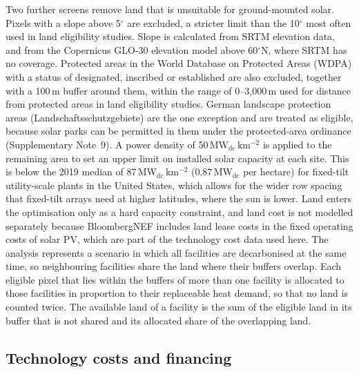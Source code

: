 \documentclass[11pt]{article}
\begin{document}
Two further screens remove land that is unsuitable for ground-mounted solar. Pixels with a slope above 5$^\circ$ are excluded, a stricter limit than the 10$^\circ$ most often used in land eligibility studies\cite{ryberg2017framework}. Slope is calculated from SRTM elevation data\cite{farr2007srtm}, and from the Copernicus GLO-30 elevation model\cite{copernicusglo30} above 60$^\circ$N, where SRTM has no coverage. Protected areas in the World Database on Protected Areas (WDPA)\cite{wdpa} with a status of designated, inscribed or established are also excluded, together with a 100\,m buffer around them, within the range of 0--3,000\,m used for distance from protected areas in land eligibility studies\cite{ryberg2017framework}. German landscape protection areas (Landschaftsschutzgebiete) are the one exception and are treated as eligible, because solar parks can be permitted in them under the protected-area ordinance\cite{keabw2026lsg} (Supplementary Note~9). A power density of 50\,MW$_{\mathrm{dc}}$\,km$^{-2}$ is applied to the remaining area to set an upper limit on installed solar capacity at each site. This is below the 2019 median of 87\,MW$_{\mathrm{dc}}$\,km$^{-2}$ (0.87\,MW$_{\mathrm{dc}}$ per hectare) for fixed-tilt utility-scale plants in the United States\cite{bolinger2022land}, which allows for the wider row spacing that fixed-tilt arrays need at higher latitudes, where the sun is lower. Land enters the optimisation only as a hard capacity constraint, and land cost is not modelled separately because BloombergNEF includes land lease costs in the fixed operating costs of solar PV\cite{bnef2026lcoemethod}, which are part of the technology cost data used here\cite{bnef2024lcoe}. The analysis represents a scenario in which all facilities are decarbonised at the same time, so neighbouring facilities share the land where their buffers overlap. Each eligible pixel that lies within the buffers of more than one facility is allocated to those facilities in proportion to their replaceable heat demand, so that no land is counted twice. The available land of a facility is the sum of the eligible land in its buffer that is not shared and its allocated share of the overlapping land.

\subsection*{Technology costs and financing}
\end{document}
